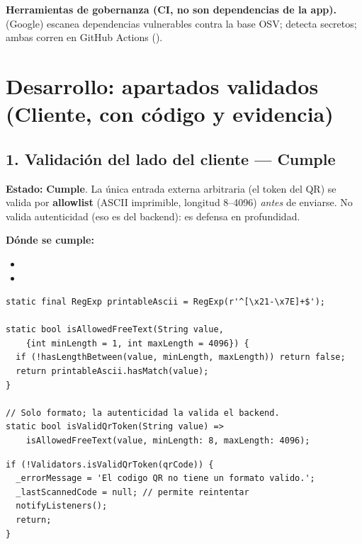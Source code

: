 \documentclass[11pt,a4paper]{article}
\newcommand{\Cumple}{\textcolor{cumpleColor}{\textbf{Cumple}}}
\begin{document}
\noindent\textbf{Herramientas de gobernanza (CI, no son dependencias de la app).} \texttt{} (Google) escanea dependencias vulnerables contra la base OSV; \texttt{} detecta secretos; ambas corren en GitHub Actions (\texttt{}).

\section{Desarrollo: apartados validados (Cliente, con código y evidencia)}
\label{sec:cliente-desarrollo}

\subsection{1. Validación del lado del cliente --- \Cumple}

\textbf{Estado:} \Cumple. La única entrada externa arbitraria (el token del QR) se valida por \textbf{allowlist} (ASCII imprimible, longitud 8--4096) \emph{antes} de enviarse. No valida autenticidad (eso es del backend): es defensa en profundidad.

\textbf{Dónde se cumple:}
\begin{itemize}[leftmargin=1.2cm,nosep]
\item \texttt{}
\item \texttt{}
\end{itemize}

\begin{lstlisting}[style=dartstyle,caption={Validación de formato del token de QR (validators.dart)}]
static final RegExp printableAscii = RegExp(r'^[\x21-\x7E]+$');

static bool isAllowedFreeText(String value,
    {int minLength = 1, int maxLength = 4096}) {
  if (!hasLengthBetween(value, minLength, maxLength)) return false;
  return printableAscii.hasMatch(value);
}

// Solo formato; la autenticidad la valida el backend.
static bool isValidQrToken(String value) =>
    isAllowedFreeText(value, minLength: 8, maxLength: 4096);
\end{lstlisting}

\begin{lstlisting}[style=dartstyle,caption={Rechazo del QR con formato inválido antes de llamar a la API (qr\_scanner\_viewmodel.dart)}]
if (!Validators.isValidQrToken(qrCode)) {
  _errorMessage = 'El codigo QR no tiene un formato valido.';
  _lastScannedCode = null; // permite reintentar
  notifyListeners();
  return;
}
\end{lstlisting}
\end{document}
